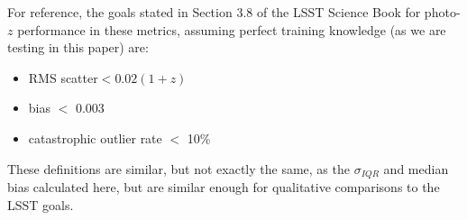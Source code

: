 For reference, the goals stated in Section 3.8 of the LSST Science Book \citep{Abell:09} for photo-$z$ performance in these metrics, assuming perfect training knowledge (as we are testing in this paper) are:
\begin{itemize}
\item RMS scatter$ < 0.02(1+z)$
\item bias $<$ 0.003 %
\item catastrophic outlier rate $<$ 10\% %
\end{itemize}
These definitions are similar, but not exactly the same, as the $\sigma_{IQR}$ and median bias calculated here, but are similar enough for qualitative comparisons to the LSST goals.

